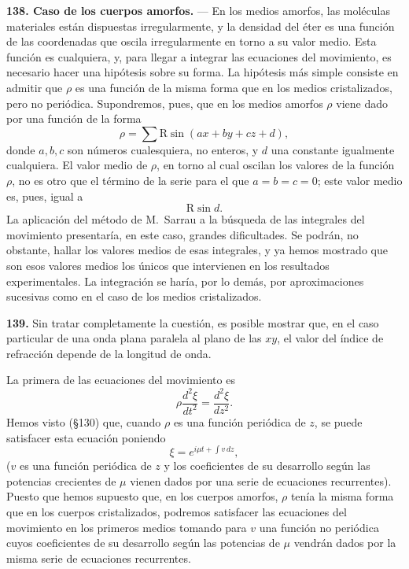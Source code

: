 \noindent\textbf{138. Caso de los cuerpos amorfos.} — En los medios
amorfos, las moléculas materiales están dispuestas irregularmente, y la
densidad del éter es una función de las coordenadas que oscila
irregularmente en torno a su valor medio. Esta función es cualquiera, y,
para llegar a integrar las ecuaciones del movimiento, es necesario hacer
una hipótesis sobre su forma. La hipótesis más simple consiste en admitir
que $\rho$ es una función de la misma forma que en los medios
cristalizados, pero no periódica. Supondremos, pues, que en los medios
amorfos $\rho$ viene dado por una función de la forma
\[
\rho=\sum \mathrm R\sin(ax+by+cz+d),
\]
donde $a,b,c$ son números cualesquiera, no enteros, y $d$ una constante
igualmente cualquiera. El valor medio de $\rho$, en torno al cual oscilan
los valores de la función $\rho$, no es otro que el término de la serie
para el que $a=b=c=0$; este valor medio es, pues, igual a
\[
\mathrm R\sin d.
\]
La aplicación del método de M.~Sarrau a la búsqueda de las integrales del
movimiento presentaría, en este caso, grandes dificultades. Se podrán, no
obstante, hallar los valores medios de esas integrales, y ya hemos
mostrado que son esos valores medios los únicos que intervienen en los
resultados experimentales. La integración se haría, por lo demás, por
aproximaciones sucesivas como en el caso de los medios cristalizados.

\noindent\textbf{139.} Sin tratar completamente la cuestión, es posible
mostrar que, en el caso particular de una onda plana paralela al plano de
las $xy$, el valor del índice de refracción depende de la longitud de
onda.

La primera de las ecuaciones del movimiento es
\[
\rho\frac{d^2\xi}{dt^2}=\frac{d^2\xi}{dz^2}.
\]
Hemos visto (§130) que, cuando $\rho$ es una función periódica de $z$, se
puede satisfacer esta ecuación poniendo
\[
\xi=e^{i\mu t+\int v\,dz},
\]
($v$ es una función periódica de $z$ y los coeficientes de su desarrollo
según las potencias crecientes de $\mu$ vienen dados por una serie de
ecuaciones recurrentes). Puesto que hemos supuesto que, en los cuerpos
amorfos, $\rho$ tenía la misma forma que en los cuerpos cristalizados,
podremos satisfacer las ecuaciones del movimiento en los primeros medios
tomando para $v$ una función no periódica cuyos coeficientes de su
desarrollo según las potencias de $\mu$ vendrán dados por la misma serie de
ecuaciones recurrentes.

